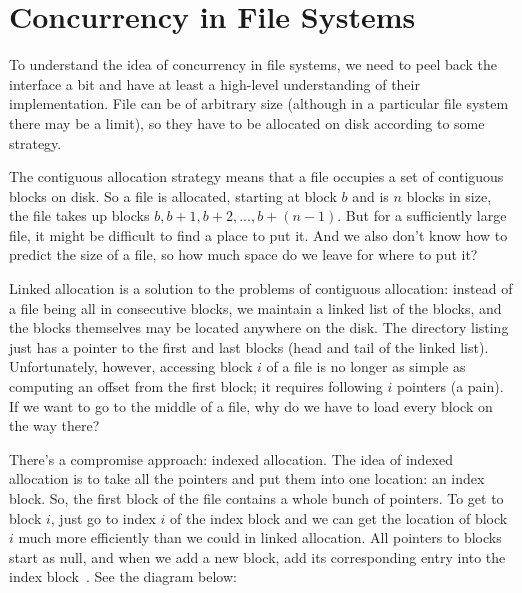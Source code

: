 




\section*{Concurrency in File Systems}

To understand the idea of concurrency in file systems, we need to peel back the interface a bit and have at least a high-level understanding of their implementation. File can be of arbitrary size (although in a particular file system there may be a limit), so they have to be allocated on disk according to some strategy.

The contiguous allocation strategy means that a file occupies a set of contiguous blocks on disk. So a file is allocated, starting at block $b$ and is $n$ blocks in size, the file takes up blocks $b, b+1, b+2, ..., b+(n-1)$. But for a sufficiently large file, it might be difficult to find a place to put it. And we also don't know how to predict the size of a file, so how much space do we leave for where to put it?

Linked allocation is a solution to the problems of contiguous allocation: instead of a file being all in consecutive blocks, we maintain a linked list of the blocks, and the blocks themselves may be located anywhere on the disk. The directory listing just has a pointer to the first and last blocks (head and tail of the linked list). Unfortunately, however, accessing block $i$ of a file is no longer as simple as computing an offset from the first block; it requires following $i$ pointers (a pain). If we want to go to the middle of a file, why do we have to load every block on the way there?

There's a compromise approach: indexed allocation. The idea of indexed allocation is to take all the pointers and put them into one location: an index block. So, the first block of the file contains a whole bunch of pointers. To get to block $i$, just go to index $i$ of the index block and we can get the location of block $i$ much more efficiently than we could in linked allocation. All pointers to blocks start as null, and when we add a new block, add its corresponding entry into the index block~\cite{osc}. See the diagram below:

